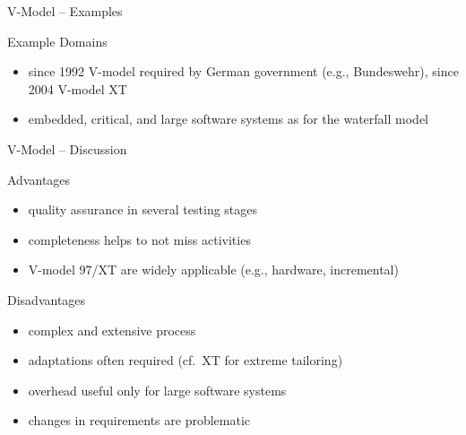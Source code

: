 \begin{frame}{V-Model -- Examples\ \mytitlesource{\ludewiglichter}}
	\begin{fancycolumns}[animation=none]
		\begin{example}{Example Domains}
			\begin{itemize}
				\item since 1992 V-model required by German government (e.g., Bundeswehr), since 2004 V-model XT
				\item embedded, critical, and large software systems as for the waterfall model
			\end{itemize}
		\end{example}
		\nextcolumn
	\end{fancycolumns}
\end{frame}

\begin{frame}{V-Model -- Discussion\ \mytitlesource{\ludewiglichter}}
	\begin{fancycolumns}
		\begin{note}{Advantages}
			\begin{itemize}
				\item quality assurance in several testing stages
				\item completeness helps to not miss activities
				\item V-model 97/XT are widely applicable (e.g., hardware, incremental)
			\end{itemize}
		\end{note}
		\nextcolumn
		\begin{note}{Disadvantages}
			\begin{itemize}
				\item complex and extensive process
				\item adaptations often required (cf.\ XT for extreme tailoring)
				\item overhead useful only for large software systems
				\item changes in requirements are problematic
			\end{itemize}
		\end{note}
	\end{fancycolumns}
\end{frame}


